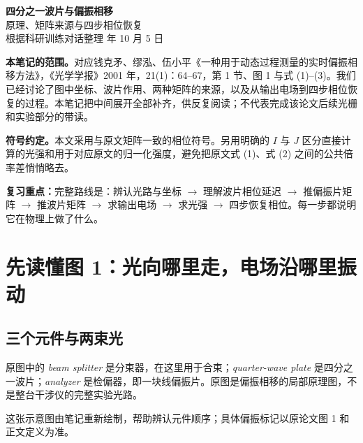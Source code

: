 \documentclass[UTF8,fontset=fandol,11pt,a4paper]{ctexart}
\newcommand{\note}[1]{\par\noindent\colorbox{pale}{\parbox{\dimexpr\linewidth-2\fboxsep\relax}{\textbf{复习重点：}#1}}\par}
\begin{document}
\begin{center}
{\LARGE\bfseries\color{ink} 四分之一波片与偏振相移}\\[6pt]
{\Large 原理、矩阵来源与四步相位恢复}\\[8pt]
{\small 根据科研训练对话整理 年 10 月 5 日}
\end{center}

\noindent\textbf{本笔记的范围。}对应钱克矛、缪泓、伍小平《一种用于动态过程测量的实时偏振相移方法》，《光学学报》2001 年，21(1)：64--67，第 1 节、图 1 与式 (1)--(3)。我们已经讨论了图中坐标、波片作用、两种矩阵的来源，以及从输出电场到四步相位恢复的过程。本笔记把中间展开全部补齐，供反复阅读；不代表完成该论文后续光栅和实验部分的带读。

\noindent\textbf{符号约定。}本文采用与原文矩阵一致的相位符号。另用明确的 $I$ 与 $J$ 区分直接计算的光强和用于对应原文的归一化强度，避免把原文式 (1)、式 (2) 之间的公共倍率差悄悄略去。

\note{完整路线是：辨认光路与坐标 $\rightarrow$ 理解波片相位延迟 $\rightarrow$ 推偏振片矩阵 $\rightarrow$ 推波片矩阵 $\rightarrow$ 求输出电场 $\rightarrow$ 求光强 $\rightarrow$ 四步恢复相位。每一步都说明它在物理上做了什么。}

\tableofcontents

\clearpage
\section{先读懂图 1：光向哪里走，电场沿哪里振动}
\subsection{三个元件与两束光}
原图中的 \textit{beam splitter} 是分束器，在这里用于合束；\textit{quarter-wave plate} 是四分之一波片；\textit{analyzer} 是检偏器，即一块线偏振片。原图是偏振相移的局部原理图，不是整台干涉仪的完整实验光路。

\begin{center}
\end{center}
这张示意图由笔记重新绘制，帮助辨认元件顺序；具体偏振标记以原论文图 1 和正文定义为准。
\end{document}
